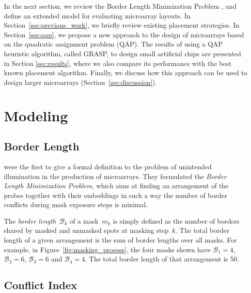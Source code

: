\documentclass[english]{lni}
\begin{document}
In the next section, we review the Border Length Minimization Problem
\cite{HANNENHALLI02}, and define an extended model for evaluating microarray
layouts. In Section~\ref{sec:previous_work}, we briefly review existing
placement strategies. In Section~\ref{sec:qap}, we propose a new approach to
the design of microarrays based on the quadratic assignment problem (QAP). The
results of using a QAP heuristic algorithm, called GRASP, to design small
artificial chips are presented in Section \ref{sec:results}, where we also
compare its performance with the best known placement algorithm. Finally, we
discuss how this approach can be used to design larger microarrays
(Section~\ref{sec:discussion}).

\section{Modeling}
\label{sec:model}

\subsection{Border Length}

\cite{HANNENHALLI02} were the first to give a formal definition to the problem
of unintended illumination in the production of microarrays. They formulated the
\emph{Border Length Minimization Problem}, which aims at finding an arrangement
of the probes together with their embeddings in such a way the number of border
conflicts during mask exposure steps is minimal.

The \emph{border length}~$\mathcal{B}_k$ of a mask~$m_{k}$ is simply
defined as the number of borders shared by masked and unmasked spots
at masking step~$k$. The total border length of a given arrangement is
the sum of border lengths over all masks. For example, in
Figure~\ref{fig:masking_process}, the four masks shown have
$\mathcal{B}_1 = 4$, $\mathcal{B}_2 = 6$, $\mathcal{B}_3 = 6$ and
$\mathcal{B}_4 = 4$. The total border length of that arrangement is 50.

\subsection{Conflict Index}
\end{document}
